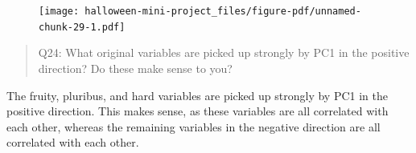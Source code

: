 \documentclass[
  letterpaper,
  DIV=11,
  numbers=noendperiod]{scrartcl}
\begin{document}
\begin{figure}[H]

{\centering \texttt{[image: halloween-mini-project\_files/figure-pdf/unnamed-chunk-29-1.pdf]}

}

\end{figure}

\begin{quote}
Q24: What original variables are picked up strongly by PC1 in the
positive direction? Do these make sense to you?
\end{quote}

The fruity, pluribus, and hard variables are picked up strongly by PC1
in the positive direction. This makes sense, as these variables are all
correlated with each other, whereas the remaining variables in the
negative direction are all correlated with each other.
\end{document}
